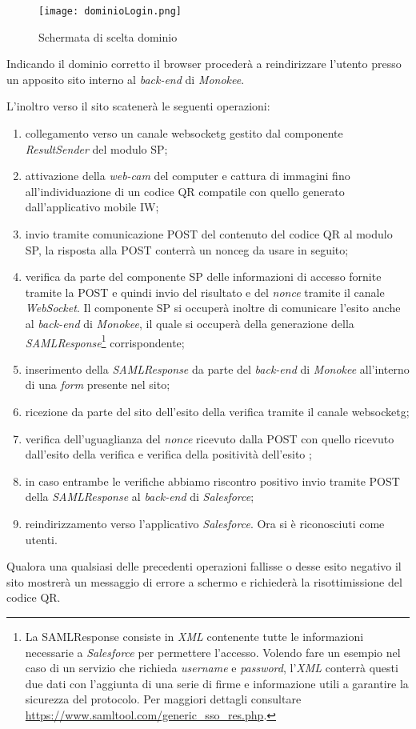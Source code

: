 \begin{figure}[!h]
    
    \centering
    \texttt{[image: dominioLogin.png]} 
    \caption{Schermata di scelta dominio}
    \label{fig:salesforce-dom} 
\end{figure}

Indicando il dominio corretto il browser procederà a reindirizzare l'utento presso un apposito sito interno al \emph{back-end} di \emph{Monokee}.

L'inoltro verso il sito scatenerà le seguenti operazioni:
\begin{enumerate}
    \item collegamento verso un canale \gls{websocketg} gestito dal componente \emph{ResultSender} del modulo SP;
    \item attivazione della \emph{web-cam} del computer e cattura di immagini fino all'individuazione di un codice QR compatile con quello generato dall'applicativo mobile IW;
    \item invio tramite comunicazione POST del contenuto del codice QR al modulo SP, la risposta alla POST conterrà un \gls{nonceg} da usare in seguito;
    \item verifica da parte del componente SP delle informazioni di accesso fornite tramite la POST e quindi invio del risultato e del \emph{nonce} tramite il canale \emph{WebSocket}. Il componente SP si occuperà inoltre di comunicare l'esito anche al \emph{back-end} di \emph{Monokee}, il quale si occuperà della generazione della \emph{SAMLResponse}\footnote{La SAMLResponse consiste in \emph{XML} contenente tutte le informazioni necessarie a \emph{Salesforce} per permettere l'accesso. Volendo fare un esempio nel caso di un servizio che richieda \emph{username} e \emph{password}, l'\emph{XML} conterrà questi due dati con l'aggiunta di una serie di firme e informazione utili a garantire la sicurezza del protocolo. Per maggiori dettagli consultare \url{https://www.samltool.com/generic_sso_res.php}.} corrispondente;
    \item inserimento della \emph{SAMLResponse} da parte del \emph{back-end} di \emph{Monokee} all'interno di una \emph{form} presente nel sito;
    \item ricezione da parte del sito dell'esito della verifica tramite il canale \gls{websocketg};
    \item verifica dell'uguaglianza del \emph{nonce} ricevuto dalla POST con quello ricevuto dall'esito della verifica e verifica della positività dell'esito ;
    \item in caso entrambe le verifiche abbiamo riscontro positivo invio tramite POST della \emph{SAMLResponse} al \emph{back-end} di \emph{Salesforce};
    \item reindirizzamento verso l'applicativo \emph{Salesforce}. Ora si è riconosciuti come utenti.
\end{enumerate}

\noindent Qualora una qualsiasi delle precedenti operazioni fallisse o desse esito negativo il sito mostrerà un messaggio di errore a schermo e richiederà la risottimissione del codice QR.
